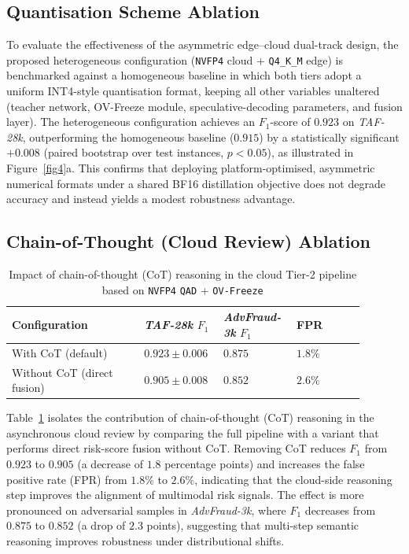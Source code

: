 \documentclass[a4paper,fleqn]{cas-sc}
\begin{document}
\subsection{Quantisation Scheme Ablation}\label{sec:quant-ablation}

To evaluate the effectiveness of the asymmetric edge--cloud dual-track design, the proposed heterogeneous configuration (\texttt{NVFP4} cloud + \texttt{Q4\_K\_M} edge) is benchmarked against a homogeneous baseline in which both tiers adopt a uniform INT4-style quantisation format, keeping all other variables unaltered (teacher network, OV-Freeze module, speculative-decoding parameters, and fusion layer). The heterogeneous configuration achieves an $F_1$-score of $0.923$ on \textit{TAF-28k}, outperforming the homogeneous baseline ($0.915$) by a statistically significant $+0.008$ (paired bootstrap over test instances, $p<0.05$), as illustrated in Figure~\ref{fig4}a. This confirms that deploying platform-optimised, asymmetric numerical formats under a shared BF16 distillation objective does not degrade accuracy and instead yields a modest robustness advantage.

\subsection{Chain-of-Thought (Cloud Review) Ablation}\label{sec:cot-ablation}

\begin{table}[t]
\centering
\caption{Impact of chain-of-thought (CoT) reasoning in the cloud Tier-2 pipeline based on \texttt{NVFP4} \texttt{QAD} + \texttt{OV-Freeze}}
\label{tab:cot-ablation-en}
\small
\renewcommand{\arraystretch}{1.1}
\begin{tabular}{>{\raggedright\arraybackslash}p{0.35\linewidth}>{\centering\arraybackslash}p{0.18\linewidth}>{\centering\arraybackslash}p{0.18\linewidth}>{\centering\arraybackslash}p{0.18\linewidth}}
\toprule
\textbf{Configuration} &
\textbf{\textit{TAF-28k} $F_1$} &
\textbf{\textit{AdvFraud-3k} $F_1$} &
\textbf{FPR} \\
\midrule
With CoT (default)
& $\mathbf{0.923 \pm 0.006}$
& $\mathbf{0.875}$
& $\mathbf{1.8\%}$ \\

Without CoT (direct fusion)
& $0.905 \pm 0.008$
& $0.852$
& $2.6\%$ \\
\bottomrule
\end{tabular}
\end{table}

Table~\ref{tab:cot-ablation-en} isolates the contribution of chain-of-thought (CoT) reasoning in the asynchronous cloud review by comparing the full pipeline with a variant that performs direct risk-score fusion without CoT.
Removing CoT reduces $F_1$ from $0.923$ to $0.905$ (a decrease of $1.8$ percentage points) and increases the false positive rate (FPR) from $1.8\%$ to $2.6\%$, indicating that the cloud-side reasoning step improves the alignment of multimodal risk signals.
The effect is more pronounced on adversarial samples in \textit{AdvFraud-3k}, where $F_1$ decreases from $0.875$ to $0.852$ (a drop of $2.3$ points), suggesting that multi-step semantic reasoning improves robustness under distributional shifts.
\end{document}
